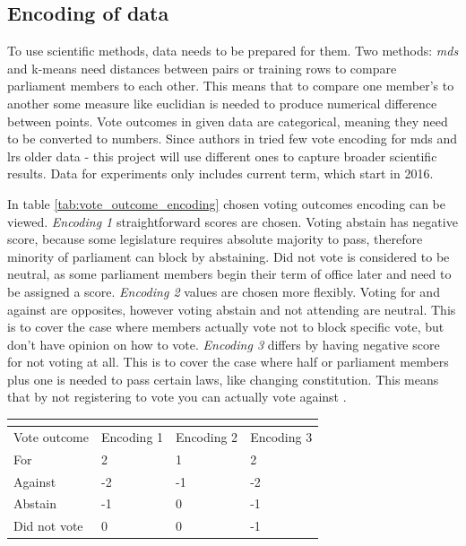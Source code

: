 \documentclass[a4paper,12pt]{article}
\begin{document}
	
	\hfill 
	
	\subsection{Encoding of data} 
	
	To use scientific methods, data needs to be prepared for them. Two methods: \textit{\acrshort{mds}} and \gls{k-means} need distances between pairs or training rows to compare parliament members to each other. This means that to compare one member's to another some measure like \gls{euclidian} is needed to produce numerical difference between points. Vote outcomes in given data are categorical, meaning they need to be converted to numbers. Since authors in  \cite{vytautas_mick_magistrinis} tried few vote encoding for \acrshort{mds} and \gls{lrs} older data - this project will use different ones to capture broader scientific results. Data for experiments only includes current term, which start in 2016.
	
	In table \ref{tab:vote_outcome_encoding} chosen voting outcomes encoding can be viewed. \textit{Encoding 1} straightforward scores are chosen. Voting abstain has negative score, because some legislature requires absolute majority to pass, therefore minority of parliament can block by abstaining. Did not vote is considered to be neutral, as some parliament members begin their term of office later and need to be assigned a score. \textit{Encoding 2} values are chosen more flexibly. Voting for and against are opposites, however voting abstain and not attending are neutral. This is to cover the case where members actually vote not to block specific vote, but don't have opinion on how to vote. \textit{Encoding 3} differs by having negative score for not voting at all. This is to cover the case where half or parliament members plus one is needed to pass certain laws, like changing constitution. This means that by not registering to vote you can actually vote against \cite{konstitucija}.
	
	\noindent
	\begin{center}
		\begin{tabular}{L{3cm} C{2cm} C{2cm} C{2cm}}
			\\ 
			\hline
			Vote outcome & Encoding 1 & Encoding 2& Encoding 3  \\\hline
			For & 2 & 1 & 2 \\
			Against & -2 & -1 & -2\\
			Abstain & -1 & 0 & -1\\
			Did not vote & 0 & 0 & -1\\
			\hline
		\end{tabular} \label{tab:vote_outcome_encoding}
	\end{center}
	
\end{document}
